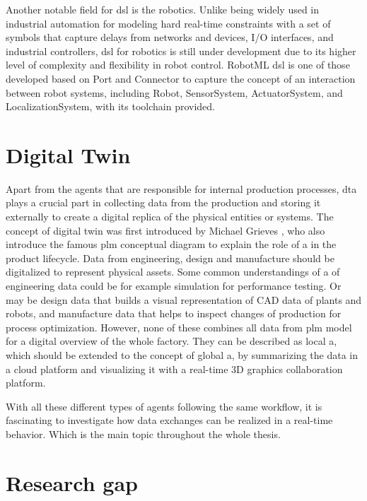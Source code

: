 Another notable field for \gls{dsl} is the robotics. Unlike being widely 
used in industrial automation for modeling hard real-time constraints with 
a set of symbols that capture delays from networks and devices, I/O interfaces, 
and industrial controllers\cite{hujo_toward_2022}, \gls{dsl} for robotics is still 
under development due to its higher level of complexity and flexibility in 
robot control. RobotML \gls{dsl}\cite{hutchison_robotml_2012} is one of those developed based on Port and Connector to
capture the concept of an interaction between robot systems, including 
Robot, SensorSystem, ActuatorSystem, and LocalizationSystem, with its toolchain 
provided\cite[fig.5]{hutchison_robotml_2012}.



\section{Digital Twin}


Apart from the agents that are responsible for internal production 
processes, \gls{dta} plays a crucial part in collecting data from the 
production and storing it externally to create a digital replica of the 
physical entities or systems. The concept of digital twin was first introduced by Michael Grieves \cite{flumerfelt_complex_2019}, who also introduce the famous \gls{plm} conceptual diagram \cite{greengard_digital_nodate}to explain the role of a in the product lifecycle. Data from engineering, design and manufacture should be digitalized to represent physical assets. Some common understandings of a of engineering data could be for example simulation for performance testing. Or may be design data that builds a visual representation of CAD data of plants and robots, and manufacture data that helps to inspect changes of production for process optimization. However, none of these combines all data from \gls{plm} model for a digital overview of the whole factory. They can be described as local a, which should be extended to the concept of global a, by summarizing the data in a cloud platform and visualizing it with a real-time 3D graphics collaboration platform. 



With all these different types of agents following the same workflow, it is fascinating to investigate how data exchanges can be realized in a real-time behavior. Which is the main topic throughout the whole thesis.


\section{Research gap}